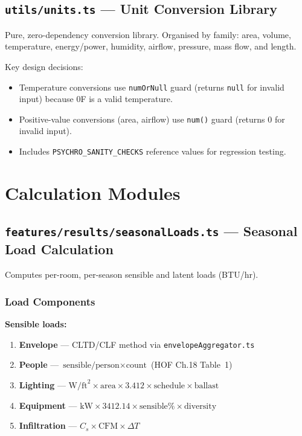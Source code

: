 \documentclass[12pt, a4paper, oneside]{report}
\newcommand{\file}[1]{\texttt{\textcolor{codeblue}{#1}}}
\newcommand{\code}[1]{\texttt{\textcolor{codered}{#1}}}
\begin{document}
\section{\file{utils/units.ts} --- Unit Conversion Library}

Pure, zero-dependency conversion library. Organised by family: area, volume, temperature, energy/power, humidity, airflow, pressure, mass flow, and length.

Key design decisions:
\begin{itemize}
  \item Temperature conversions use \code{numOrNull} guard (returns \code{null} for invalid input) because 0\textdegree F is a valid temperature.
  \item Positive-value conversions (area, airflow) use \code{num()} guard (returns 0 for invalid input).
  \item Includes \code{PSYCHRO\_SANITY\_CHECKS} reference values for regression testing.
\end{itemize}


\chapter{Calculation Modules}

\section{\file{features/results/seasonalLoads.ts} --- Seasonal Load Calculation}

Computes per-room, per-season sensible and latent loads (BTU/hr).

\subsection{Load Components}

\textbf{Sensible loads:}
\begin{enumerate}
  \item \textbf{Envelope} --- CLTD/CLF method via \code{envelopeAggregator.ts}
  \item \textbf{People} --- $\text{sensible/person} \times \text{count}$ (HOF Ch.18 Table~1)
  \item \textbf{Lighting} --- $\text{W/ft}^2 \times \text{area} \times 3.412 \times \text{schedule} \times \text{ballast}$
  \item \textbf{Equipment} --- $\text{kW} \times 3412.14 \times \text{sensible\%} \times \text{diversity}$
  \item \textbf{Infiltration} --- $C_s \times \text{CFM} \times \Delta T$
\end{enumerate}
\end{document}
